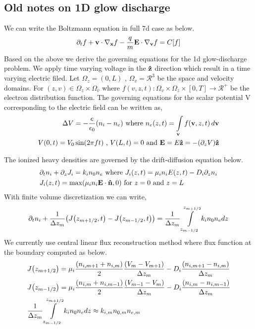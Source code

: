 \documentclass{article}[draft]
\begin{document}
\ \ 
\newpage
\newpage
\subsection{Old notes on 1D glow discharge}
We can write the Boltzmann equation in full 7d case as below. 
\begin{align*}
\partial_t f + \mathbf{v}\cdot \nabla_{\mathbf{x}} f -\frac{q}{m} \mathbf{E} \cdot \nabla_{\mathbf{v}} f = C[f]
\end{align*}
Based on the above we derive the governing equations for the 1d glow-discharge problem. We apply time varying voltage in the $\mathbf{\hat{z}}$ direction which result in a time varying electric filed. Let $\Omega_z=(0, L)$ , $\Omega_v= \mathcal{R}^3$ be the space and velocity domains. For $(z, v) \in \Omega_{z} \times \Omega_v$ where $f (v, z, t) : \Omega_{v} \times \Omega_{z} × [0,T] \rightarrow \mathcal{R}^{+}$ be the electron distribution function. The governing equations for the scalar potential V corresponding to the electric field can be written as,
\begin{align*}
	\Delta V = -\frac{e}{\epsilon_0} (n_i-n_e) \text{ where } n_e(z,t) = \myint_{\vect{v}} f(\vect{v}, z, t) \diff{\vect{v}} \\
	V(0,t) = V_0 \sin(2\pi ft) \text{ , } V(L,t) = 0 \text{ and } \vect{E} = E \vect{\hat{z}} = -\of{\partial_z V} \vect{\hat{z}}
\end{align*} 

\par The ionized heavy densities are governed by the drift-diffusion equation below.
\begin{align*}
	&\partial_t n_i + \partial_z J_i = k_i n_0 n_e \text{ where } J_i\of{z, t} = \mu_i n_i E\of{z,t} -D_i \partial_z n_i\\
	&J_i(z,t)=\max\of{\mu_i n_i \vect{E}\cdot \vect{\hat{n}},0} \text{ for } z =0 \text{ and } z=L
\end{align*} With finite volume discretization we can write, 
\begin{align}
	\partial_t n_i + \frac{1}{\Delta z_m} \of{J\of{z_{m+1/2},t} - J\of{z_{m-1/2},t}} = \frac{1}{\Delta z_m}  \myint_{z_{m-1/2}}^{z_{m+1/2}} k_i n_0 n_e dz
\end{align} We currently use central linear flux reconstruction method where flux function at the boundary computed as below. 
\begin{align*}
&J\of{z_{m+1/2}} = \mu_i \frac{\of{n_{i,m+1} + n_{i,m}}}{2} \frac{\of{V_m-V_{m+1}}}{\Delta z_m} - D_i \frac{\of{n_{i, m+1} -n_{i, m}}}{\Delta z_m} \\
&J\of{z_{m-1/2}} = \mu_i \frac{\of{n_{i,m} + n_{i,m-1}}}{2} \frac{\of{V_{m-1}-V_{m}}}{\Delta z_m} - D_i \frac{\of{n_{i, m} -n_{i, m-1}}}{\Delta z_m} \\
&\frac{1}{\Delta z_m}  \myint_{z_{m-1/2}}^{z_{m+1/2}}  k_i n_0 n_e dz \approx k_{i,m} n_{0,m} n_{e,m} 
\end{align*}
\end{document}
